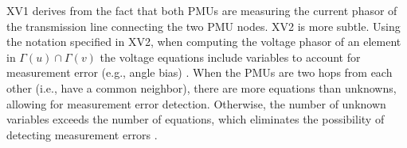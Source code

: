 XV1 derives from the fact that both PMUs are measuring the current phasor of the transmission line connecting the two PMU nodes.  XV2 is more subtle.  
Using the notation specified in XV2, when computing the voltage phasor of an element in $\Gamma(u)\cap\Gamma(v)$ the voltage equations include variables to 
account for measurement error (e.g., angle bias) \cite{Vanfretti-thesis}. 
When the PMUs are two hops from each other (i.e., have a common neighbor), there are more equations than unknowns, allowing for measurement error detection. 
Otherwise, the number of unknown variables exceeds the number of equations, which eliminates the possibility of detecting measurement errors \cite{Vanfretti-thesis}.





